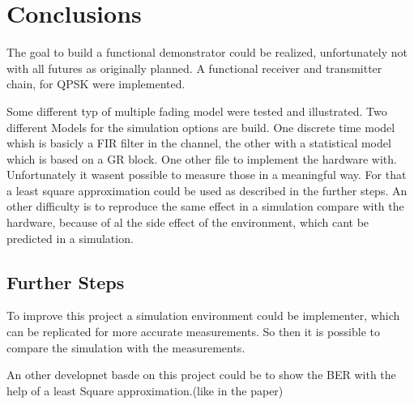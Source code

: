 
\chapter{Conclusions} \label{chp:conclusions}

The goal to build a functional demonstrator could be realized, unfortunately not with all futures as originally planned. A functional receiver and transmitter chain, for QPSK were implemented.

Some different typ of multiple fading model were tested and illustrated.
Two different Models for the simulation options are build. One discrete time model whish is  basicly a FIR filter in the channel, the other with a statistical model which is based on a GR block.
One other file to implement the hardware with. Unfortunately it wasent possible to measure those in a meaningful way. For that a least square approximation could be used as described in the further steps. An other difficulty is to reproduce the same effect in a simulation compare with the hardware, because of al the side effect of the environment, which cant be predicted in a simulation.



\section{Further Steps}

To improve this project a simulation environment could be implementer, which can be replicated for more accurate measurements. So then it is possible to compare the simulation with the measurements.

An other  developnet basde on this project could be to show the BER with the help of a least Square approximation.(like in the paper)
